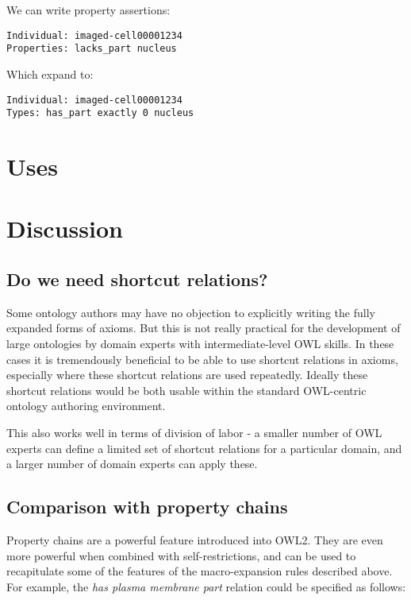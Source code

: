 \documentclass{llncs}
\begin{document}
We can write property assertions:

\begin{verbatim}
Individual: imaged-cell00001234
Properties: lacks_part nucleus
\end{verbatim}

Which expand to:

\begin{verbatim}
Individual: imaged-cell00001234
Types: has_part exactly 0 nucleus
\end{verbatim}

\section{Uses}


\section{Discussion}

\subsection{Do we need shortcut relations?}

Some ontology authors may have no objection to explicitly writing the
fully expanded forms of axioms. But this is not really practical for
the development of large ontologies by domain experts with
intermediate-level OWL skills. In these cases it is tremendously
beneficial to be able to use shortcut relations in axioms, especially
where these shortcut relations are used repeatedly. Ideally these
shortcut relations would be both usable within the standard
OWL-centric ontology authoring environment.

This also works well in terms of division of labor - a smaller number
of OWL experts can define a limited set of shortcut relations for a
particular domain, and a larger number of domain experts can apply
these.

\subsection{Comparison with property chains}

Property chains are a powerful feature introduced into OWL2. They are
even more powerful when combined with self-restrictions, and can be
used to recapitulate some of the features of the macro-expansion rules
described above. For example, the \emph{has plasma membrane part}
relation could be specified as follows:
\end{document}
